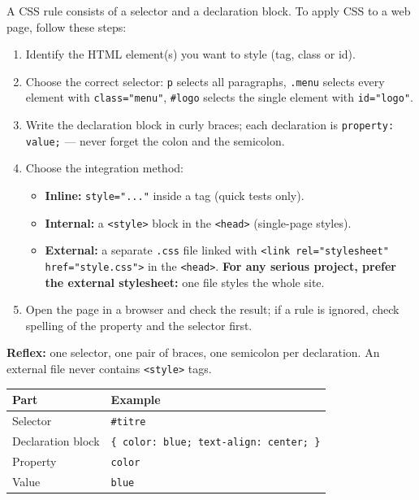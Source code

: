 \documentclass[11pt]{article}
\newcommand{\cle}[1]{{\popxbold\color{popdark}#1}}
\begin{document}
\begin{methode}
A CSS \cle{rule} consists of a \cle{selector} and a \cle{declaration block}. To apply CSS to a web page, follow these steps:
\begin{enumerate}
\item Identify the HTML element(s) you want to style (tag, class or id).
\item Choose the correct selector: \texttt{p} selects all paragraphs, \texttt{.menu} selects every element with \texttt{class="menu"}, \texttt{\#logo} selects the single element with \texttt{id="logo"}.
\item Write the declaration block in curly braces; each declaration is \texttt{property: value;} — never forget the colon and the semicolon.
\item Choose the integration method:
      \begin{itemize}
      \item \textbf{Inline:} \texttt{style="..."} inside a tag (quick tests only).
      \item \textbf{Internal:} a \texttt{<style>} block in the \texttt{<head>} (single-page styles).
      \item \textbf{External:} a separate \texttt{.css} file linked with \texttt{<link rel="stylesheet" href="style.css">} in the \texttt{<head>}. \textbf{For any serious project, prefer the external stylesheet:} one file styles the whole site.
      \end{itemize}
\item Open the page in a browser and check the result; if a rule is ignored, check spelling of the property and the selector first.
\end{enumerate}
\textbf{Reflex:} one selector, one pair of braces, one semicolon per declaration. An external file never contains \texttt{<style>} tags.
\end{methode}

\begin{aretenir}
\begin{center}
\begin{tabular}{|l|l|}
\hline
\textbf{Part} & \textbf{Example} \\ \hline
Selector & \texttt{\#titre} \\ \hline
Declaration block & \texttt{\{ color: blue; text-align: center; \}} \\ \hline
Property & \texttt{color} \\ \hline
Value & \texttt{blue} \\ \hline
\end{tabular}
\end{center}
\end{aretenir}
\end{document}
